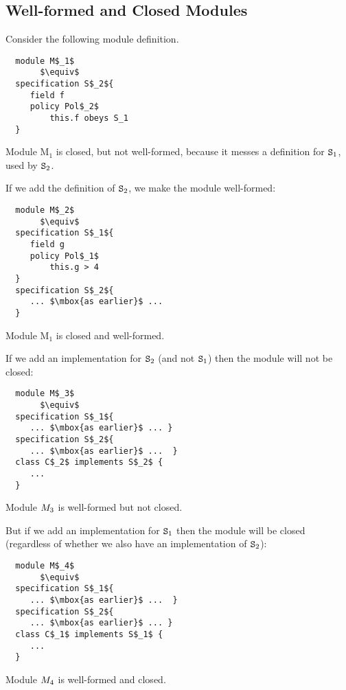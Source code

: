 \section{}
\label{examples}

\subsection{Well-formed and Closed Modules}
\label{problems:wellFormedModule}

Consider the following module definition.

 \begin{lstlisting}
  module M$_1$
       $\equiv$
  specification S$_2${
     field f
     policy Pol$_2$
         this.f obeys S_1
  }
\end{lstlisting}
\noindent
Module M$_1$ is closed, but not well-formed, because it messes a definition for ${\textrm{\ttfamily{S}}}_1$, used by ${\textrm{\ttfamily{S}}}_2$.

If we add the definition of ${\textrm{\ttfamily{S}}}_2$, we make the module well-formed:

\begin{lstlisting}
  module M$_2$
       $\equiv$
  specification S$_1${
     field g
     policy Pol$_1$
         this.g > 4
  }
  specification S$_2${
     ... $\mbox{as earlier}$ ...
  }
\end{lstlisting}
Module M$_1$ is closed and well-formed.
 
 If we add an implementation for ${\textrm{\ttfamily{S}}}_2$ (and not ${\textrm{\ttfamily{S}}}_1$) then the module will   not be closed:

\begin{lstlisting}
  module M$_3$
       $\equiv$
  specification S$_1${
     ... $\mbox{as earlier}$ ... }
  specification S$_2${
     ... $\mbox{as earlier}$ ...  }
  class C$_2$ implements S$_2$ {
     ...
  }
\end{lstlisting}
\noindent 
Module $M_3$ is well-formed but not closed.

But if we add an implementation for ${\textrm{\ttfamily{S}}}_1$    then the module will be    closed (regardless of whether we also have an implementation of  ${\textrm{\ttfamily{S}}}_2$):

\begin{lstlisting}
  module M$_4$
       $\equiv$
  specification S$_1${
     ... $\mbox{as earlier}$ ...  }
  specification S$_2${
     ... $\mbox{as earlier}$ ... }
  class C$_1$ implements S$_1$ {
     ...
  }
\end{lstlisting}
\noindent 
Module $M_4$ is well-formed and closed.

